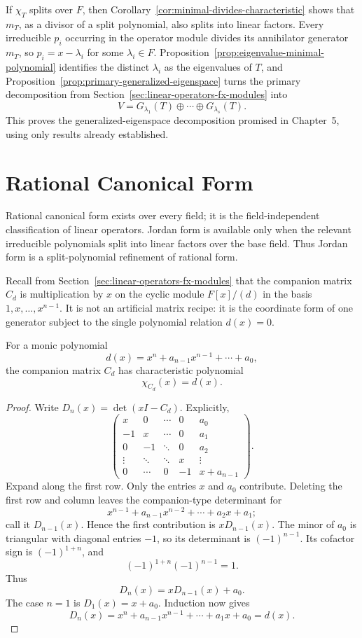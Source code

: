 If \(\chi_T\) splits over \(F\), then
Corollary~\ref{cor:minimal-divides-characteristic} shows that \(m_T\), as a
divisor of a split polynomial, also splits into linear factors. Every
irreducible \(p_i\) occurring in the operator module divides its annihilator
generator \(m_T\), so \(p_i=x-\lambda_i\) for some \(\lambda_i\in F\).
Proposition~\ref{prop:eigenvalue-minimal-polynomial} identifies the distinct
\(\lambda_i\) as the eigenvalues of \(T\), and
Proposition~\ref{prop:primary-generalized-eigenspace} turns the primary
decomposition from Section~\ref{sec:linear-operators-fx-modules} into
\[
V=G_{\lambda_1}(T)\oplus\cdots\oplus G_{\lambda_s}(T).
\]
This proves the generalized-eigenspace decomposition promised in Chapter~5,
using only results already established.

\iffalse
\section{Rational Canonical Form}
Rational canonical form exists over every field; it is the field-independent
classification of linear operators. Jordan form is available only when the
relevant irreducible polynomials split into linear factors over the base
field. Thus Jordan form is a split-polynomial refinement of rational form.

Recall from Section~\ref{sec:linear-operators-fx-modules} that the companion
matrix \(C_d\) is multiplication by \(x\) on the cyclic module
\(F[x]/(d)\) in the basis \(1,x,\ldots,x^{n-1}\). It is not an artificial
matrix recipe: it is the coordinate form of one generator subject to the
single polynomial relation \(d(x)=0\).

\begin{theorem}
\label{thm:companion-characteristic}
For a monic polynomial
\[
d(x)=x^n+a_{n-1}x^{n-1}+\cdots+a_0,
\]
the companion matrix \(C_d\) has characteristic polynomial
\[
\chi_{C_d}(x)=d(x).
\]
\end{theorem}
\begin{proof}
Write \(D_n(x)=\det(xI-C_d)\). Explicitly,
\[
\begin{pmatrix}
x&0&\cdots&0&a_0\\
-1&x&\cdots&0&a_1\\
0&-1&\ddots&0&a_2\\
\vdots&\ddots&\ddots&x&\vdots\\
0&\cdots&0&-1&x+a_{n-1}
\end{pmatrix}.
\]
Expand along the first row. Only the entries \(x\) and \(a_0\) contribute.
Deleting the first row and column leaves the companion-type determinant for
\[
x^{n-1}+a_{n-1}x^{n-2}+\cdots+a_2x+a_1;
\]
call it \(D_{n-1}(x)\). Hence the first contribution is
\(xD_{n-1}(x)\). The minor of \(a_0\) is triangular with diagonal entries
\(-1\), so its determinant is \((-1)^{n-1}\). Its cofactor sign is
\((-1)^{1+n}\), and
\[
(-1)^{1+n}(-1)^{n-1}=1.
\]
Thus
\[
D_n(x)=xD_{n-1}(x)+a_0.
\]
The case \(n=1\) is \(D_1(x)=x+a_0\). Induction now gives
\[
D_n(x)=x^n+a_{n-1}x^{n-1}+\cdots+a_1x+a_0=d(x).
\]
\end{proof}

